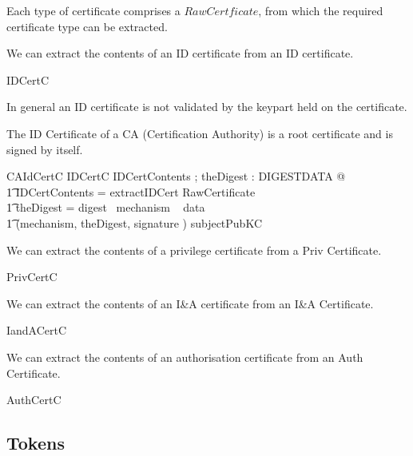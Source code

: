 Each type of certificate comprises a $RawCertficate$, from which the
required certificate type can be extracted.

We can extract the contents of an ID certificate from an ID certificate.

\begin{zed}
        IDCertC 
\end{zed}

In general an ID certificate is not validated by the keypart held on
the certificate. 

The ID Certificate of a CA (Certification Authority) is a root
certificate and is signed by itself.

\begin{schema}{CAIdCertC}
        IDCertC
\where
        \exists IDCertContents ; theDigest : DIGESTDATA @
\\ \t1       \theta IDCertContents = extractIDCert \theta RawCertificate 
\\ \t1       \land theDigest = digest~ mechanism ~ data
\\ \t1       \land (mechanism, theDigest, signature ) \isVerifiedBy subjectPubKC 
\end{schema}

We can extract the contents of a privilege certificate from a Priv Certificate.
\begin{zed}
        PrivCertC 
\end{zed}

We can extract the contents of an I\&A certificate from an I\&A Certificate.
\begin{zed}
        IandACertC 
\end{zed}

We can extract the contents of an authorisation certificate from an Auth Certificate.
\begin{zed}
        AuthCertC 
\end{zed}


\subsection{Tokens}

